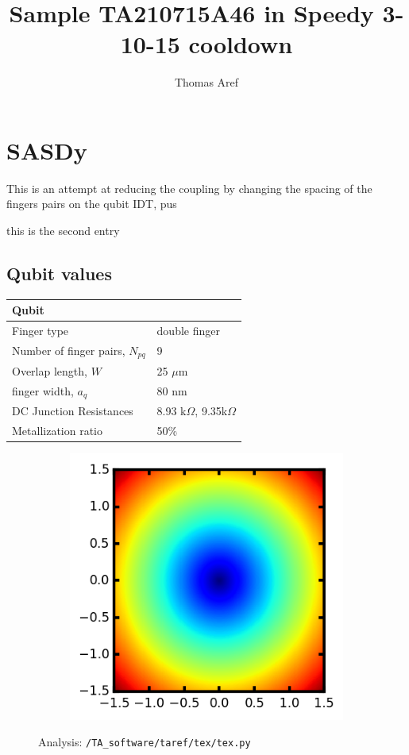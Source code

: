 \documentclass[12pt,a4paper]{article}
\newcommand{\pyb}[1]{} %
\newcommand{\pye}{} %
\begin{document}
\author{Thomas Aref}
\title{Sample TA210715A46 in Speedy 3-10-15 cooldown}
\maketitle
\noindent
\pyb {summary}
    \section{SASDy}
    This is an attempt at reducing the coupling by changing the spacing of the fingers pairs on the qubit IDT, pus

\pye

\pyb {second entry}
this is the second entry
\pye

\subsection{Qubit values}
\begin{tabular}{|p{5 cm}|p{3 cm}|}
\hline
 Qubit & {} \\
\hline
 Finger type & double finger \\
\hline
 Number of finger pairs, $N_{pq}$ & 9 \\
\hline
 Overlap length, $W$ & 25 $\mu$m \\
\hline
 finger width, $a_q$ & 80 nm \\
\hline
 DC Junction Resistances & 8.93 k$\Omega$, 9.35k$\Omega$ \\
\hline
 Metallization ratio & 50\% \\
\hline
\end{tabular}

\setcounter{subfigure}{0} %
\begin{figure}[ht!]
\centering
\begin{subfigure}[b]{0.49\textwidth}
\includegraphics[width=\textwidth]{test_colormap_plot.png}
\end{subfigure}
\label{fig:setup}
\cprotect\caption{Analysis: \verb;/TA_software/taref/tex/tex.py;}
\end{figure}
\end{document}
